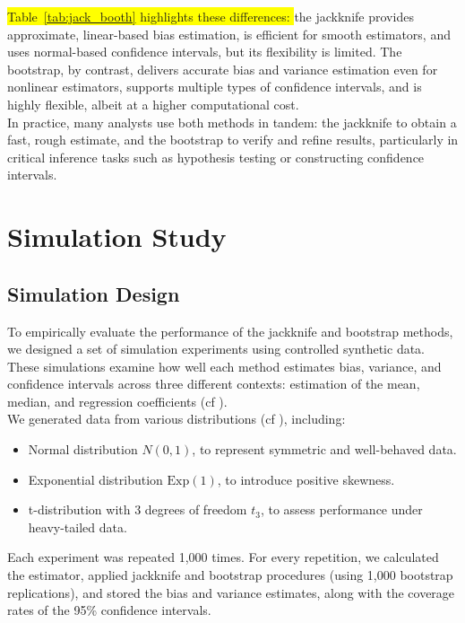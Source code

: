 \documentclass[aodsor,preprint]{imsart}
\numberwithin{equation}{section}
\theoremstyle{plain}
\begin{document}
 \colorbox{yellow}{Table~\ref{tab:jack_booth} highlights these differences: }the jackknife provides approximate, linear-based bias estimation, is efficient for smooth estimators, and uses normal-based confidence intervals, but its flexibility is limited. The bootstrap, by contrast, delivers accurate bias and variance estimation even for nonlinear estimators, supports multiple types of confidence intervals, and is highly flexible, albeit at a higher computational cost.\\

In practice, many analysts use both methods in tandem: the jackknife to obtain a fast, rough estimate, and the bootstrap to verify and refine results, particularly in critical inference tasks such as hypothesis testing or constructing confidence intervals.\\

\section{Simulation Study}

\subsection{Simulation Design}

To empirically evaluate the performance of the jackknife and bootstrap methods, we designed a set of simulation experiments using controlled synthetic data. These simulations examine how well each method estimates bias, variance, and confidence intervals across three different contexts: estimation of the mean, median, and regression coefficients (cf \cite{efron1993introduction,shao1995jackknife,davison1997bootstrap}).\\

We generated data from various distributions (cf \cite{davison1997bootstrap,efron1993introduction}), including:
\begin{itemize}
  \item Normal distribution \( N(0, 1) \), to represent symmetric and well-behaved data.
  \item Exponential distribution \( \text{Exp}(1) \), to introduce positive skewness.
  \item t-distribution with 3 degrees of freedom \( t_3 \), to assess performance under heavy-tailed data.
\end{itemize}

Each experiment was repeated 1,000 times. For every repetition, we calculated the estimator, applied jackknife and bootstrap procedures (using 1,000 bootstrap replications), and stored the bias and variance estimates, along with the coverage rates of the 95\% confidence intervals.\\
\end{document}
